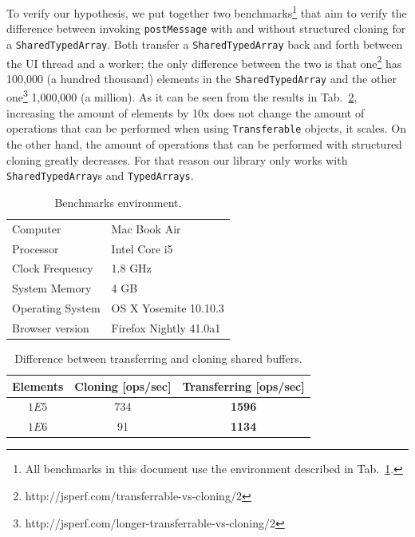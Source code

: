 \documentclass[runningheads,a4paper]{llncs}
\begin{document}
To verify our hypothesis, we put together two benchmarks\footnote{All benchmarks in this document use the environment described in Tab.~\ref{tab:env}.} that aim to verify the difference between invoking \verb+postMessage+ with and without structured cloning for a \verb+SharedTypedArray+. Both transfer a \verb+SharedTypedArray+ back and forth between the UI thread and a worker; the only difference between the two is that one\footnote{http://jsperf.com/transferrable-vs-cloning/2} has 100,000 (a hundred thousand) elements in the \verb+SharedTypedArray+ and the other one\footnote{http://jsperf.com/longer-transferrable-vs-cloning/2} 1,000,000 (a million). As it can be seen from the  results in Tab.~\ref{tab:transf-vs-clone}, increasing the amount of elements by 10x does not change the amount of operations that can be performed when using \verb+Transferable+ objects, it scales. On the other hand, the amount of operations that can be performed with structured cloning greatly decreases. For that reason our library only works with \verb+SharedTypedArray+s and \verb+TypedArrays+.

\begin{table}
  \centering
  \begin{tabular}{|l|l|}
    \hline
    Computer & Mac Book Air \\
    Processor & Intel Core i5 \\
    Clock Frequency & 1.8 GHz \\
    System Memory & 4 GB \\
    Operating System & OS X Yosemite 10.10.3 \\
    Browser version & Firefox Nightly 41.0a1 \\
    \hline
  \end{tabular}
  \caption{Benchmarks environment.}
  \label{tab:env}
\end{table}

\begin{table}
  \centering
  \begin{tabular}{|c|c|c|}
    \hline
    Elements & Cloning [ops/sec] & Transferring [ops/sec] \\
    \hline
    \(1E5\) & 734 & \textbf{1596} \\
    \(1E6\) & 91 & \textbf{1134} \\
    \hline
  \end{tabular}
  \caption{Difference between transferring and cloning shared buffers.}
  \label{tab:transf-vs-clone}
\end{table}
\end{document}
